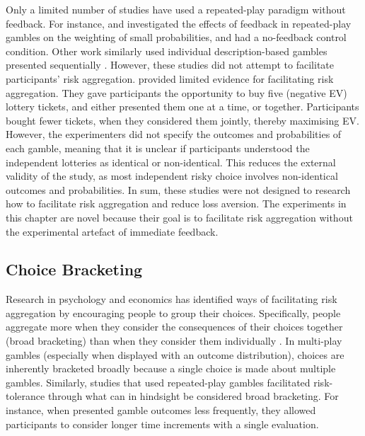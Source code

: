 \documentclass[a4paper, nobind]{templates/ociamthesis}
\theoremstyle{definition}
\theoremstyle{definition}
\theoremstyle{definition}
\theoremstyle{definition}
\theoremstyle{remark}
\begin{document}
Only a limited number of studies have used a repeated-play paradigm without
feedback. For instance, \textcite{jessup2008} and \textcite{hertwig2004} investigated the effects of
feedback in repeated-play gambles on the weighting of small probabilities, and
had a no-feedback control condition. Other work similarly used individual
description-based gambles presented sequentially \autocites[e.g.,][]{ert2013,joag1990}.
However, these studies did not attempt to facilitate participants' risk
aggregation. \textcite{haisley2008} provided limited evidence for facilitating risk
aggregation. They gave participants the opportunity to buy five (negative EV)
lottery tickets, and either presented them one at a time, or together.
Participants bought fewer tickets, when they considered them jointly, thereby
maximising EV. However, the experimenters did not specify the outcomes and
probabilities of each gamble, meaning that it is unclear if participants
understood the independent lotteries as identical or non-identical. This reduces
the external validity of the study, as most independent risky choice involves
non-identical outcomes and probabilities. In sum, these studies were not
designed to research how to facilitate risk aggregation and reduce loss
aversion. The experiments in this chapter are novel because their goal is to
facilitate risk aggregation without the experimental artefact of immediate
feedback.

\subsection{Choice Bracketing}

Research in psychology and economics has identified ways of facilitating risk
aggregation by encouraging people to group their choices. Specifically, people
aggregate more when they consider the consequences of their choices together
(broad bracketing) than when they consider them individually \autocite[narrow
bracketing;][]{read1999}. In multi-play gambles (especially when displayed with
an outcome distribution), choices are inherently bracketed broadly because a
single choice is made about multiple gambles. Similarly, studies that used
repeated-play gambles facilitated risk-tolerance through what can in hindsight
be considered broad bracketing. For instance, when \textcite{thaler1997} presented gamble
outcomes less frequently, they allowed participants to consider longer time
increments with a single evaluation.
\end{document}

